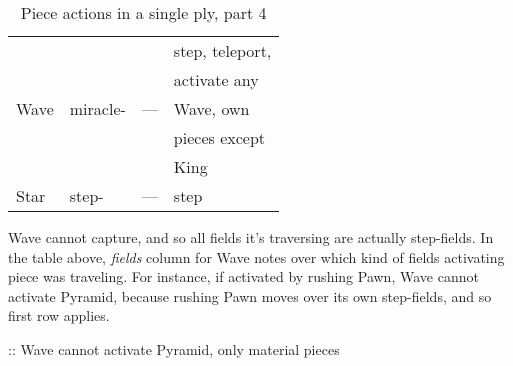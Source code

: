 \begin{table}[!h]
\begin{tabular}{ llll }
\cmidrule{1-4} %
\multirow{5}{*}{Wave}       & \multirow{5}{*}{miracle\footnotemark[4]-}
                                                        & \multirow{5}{*}{---}          & step, teleport,           \\
                            &                           &                               & activate any              \\
                            &                           &                               & Wave, own                 \\
                            &                           &                               & pieces except             \\
                            &                           &                               & King                      \\
\cmidrule{1-4} %
Star                        & step-                     & ---                           & step                      \\
\bottomrule %
\end{tabular}
\caption{Piece actions in a single ply, part 4}
\label{tbl:Appendix/Summary/Piece actions, part 4}
\end{table}


Wave cannot capture, and so all fields it's traversing are actually step-fields.
In the table above, \emph{fields} column for Wave notes over which kind of fields
activating piece was traveling. For instance, if activated by rushing Pawn, Wave
cannot activate Pyramid, because rushing Pawn moves over its own step-fields, and
so first row applies.

\TODO :: Wave cannot activate Pyramid, only material pieces

\clearpage %

